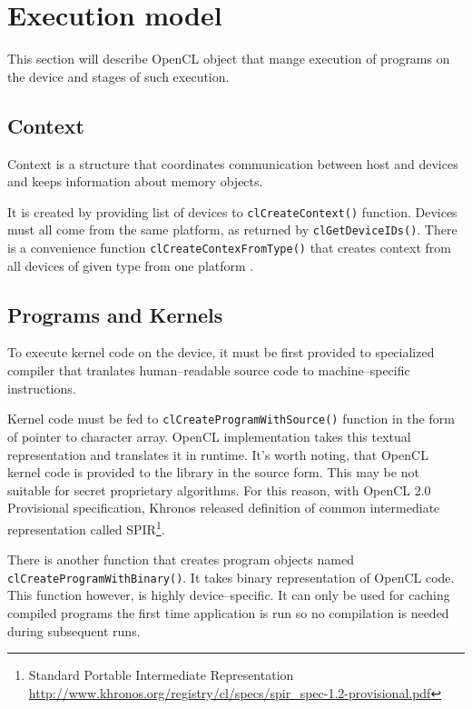 \section{Execution model}
\label{sec:clexecmodel}

This section will describe OpenCL object that mange execution of programs on the
device and stages of such execution.

\subsection{Context}

Context is a structure that coordinates communication between host and devices
and keeps information about memory objects. 

It is created by providing list of devices to \texttt{clCreateContext()}
function. Devices must all come from the same platform, as returned by
\texttt{clGetDeviceIDs()}. There is a convenience function \texttt{clCreate\-Contex\-FromType()}
that creates context from all devices of given type from one platform \parencite{openclspec}.

\subsection{Programs and Kernels}

To execute kernel code on the device, it must be first provided to specialized
compiler that tranlates human--readable source code to machine--specific
instructions.

Kernel code must be fed to \texttt{clCreate\-Program\-WithSource()} function in the form of
pointer to character array. OpenCL implementation takes this textual
representation and translates it in runtime. It's worth noting, that OpenCL kernel
code is provided to the library in the source form. This may be not suitable for
secret proprietary algorithms. For this reason, with OpenCL 2.0 Provisional
specification, Khronos released definition of common intermediate
representation called SPIR\footnote{Standard Portable Intermediate Representation
  \url{http://www.khronos.org/registry/cl/specs/spir_spec-1.2-provisional.pdf}}.

There is another function that creates program objects named\\
\texttt{clCreate\-Program\-With\-Binary()}. It takes binary representation of OpenCL
code. This function however, is highly device--specific. It can only be used
for caching compiled programs the first time application is run so no compilation
is needed during subsequent runs.

